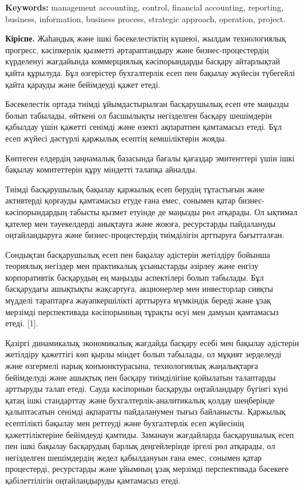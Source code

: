 {\bfseries Keywords:} management accounting, control, financial accounting,
reporting, business, information, business process, strategic approach,
operation, project.
\begin{multicols}{2}

{\bfseries Кіріспе.} Жаһандық және ішкі бәсекелестіктің күшеюі, жылдам
технологиялық прогресс, кәсіпкерлік қызметті әртараптандыру және
бизнес-процестердің күрделенуі жағдайында коммерциялық кәсіпорындарды
басқару айтарлықтай қайта құрылуда. Бұл өзгерістер бухгалтерлік есеп пен
бақылау жүйесін түбегейлі қайта қарауды және бейімдеуді қажет етеді.

Бәсекелестік ортада тиімді ұйымдастырылған басқарушылық есеп өте маңызды
болып табылады, өйткені ол басшылықты негізделген басқару шешімдерін
қабылдау үшін қажетті сенімді және өзекті ақпаратпен қамтамасыз етеді.
Бұл есеп жүйесі дәстүрлі қаржылық есептің кемшіліктерін жояды.

Көптеген елдердің заңнамалық базасында бағалы қағаздар эмитенттері үшін
ішкі бақылау комитеттерін құру міндетті талапқа айналды.

Тиімді басқарушылық бақылау қаржылық есеп берудің тұтастығын және
активтерді қорғауды қамтамасыз етуде ғана емес, сонымен қатар
бизнес-кәсіпорындардың табысты қызмет етуінде де маңызды рөл атқарады.
Ол ықтимал қателер мен тәуекелдерді анықтауға және жоюға, ресурстарды
пайдалануды оңтайландыруға және бизнес-процестердің тиімділігін
арттыруға бағытталған.

Сондықтан басқарушылық есеп пен бақылау әдістерін жетілдіру бойынша
теориялық негіздер мен практикалық ұсыныстарды әзірлеу және енгізу
корпоративтік басқарудың ең маңызды аспектілері болып табылады. Бұл
басқарудағы ашықтықты жақсартуға, акционерлер мен инвесторлар сияқты
мүдделі тараптарға жауапкершілікті арттыруға мүмкіндік береді және ұзақ
мерзімді перспективада кәсіпорынның тұрақты өсуі мен дамуын қамтамасыз
етеді. {[}1{]}.

Қазіргі динамикалық экономикалық жағдайда басқару есебі мен бақылау
әдістерін жетілдіру қажеттігі көп қырлы міндет болып табылады, ол мұқият
зерделеуді және өзгермелі нарық конъюнктурасына, технологиялық
жаңалықтарға бейімделуді және ашықтық пен басқару тиімділігіне қойылатын
талаптарды арттыруды талап етеді. Сауда кәсіпорнын басқаруды
оңтайландыру бүгінгі күні қатаң ішкі стандарттау және
бухгалтерлік-аналитикалық қолдау шеңберінде қалыптасатын сенімді
ақпаратты пайдаланумен тығыз байланысты. Қаржылық есептілікті бақылау
мен реттеуді және бухгалтерлік есеп жүйесінің қажеттіліктеріне
бейімдеуді қамтиды. Заманауи жағдайларда басқарушылық есеп пен ішкі
бақылау басқарудың барлық деңгейлерінде іргелі рөл атқарады, ол
негізделген шешімдердің жедел қабылдануын ғана емес, сонымен қатар
процестерді, ресурстарды және ұйымның ұзақ мерзімді перспективада
бәсекеге қабілеттілігін оңтайландыруды қамтамасыз етеді.


\end{multicols}
